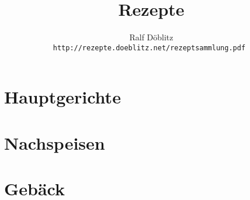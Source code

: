 \documentclass[12pt,a4paper]{report}
\begin{document}
\title{\bfseries\Huge Rezepte}
\author{
  Ralf Döblitz\\[1cm]
  \tt{http://rezepte.doeblitz.net/rezeptsammlung.pdf}
}
\maketitle
\tableofcontents

\chapter{Hauptgerichte}


\chapter{Nachspeisen}


\chapter{Gebäck}






\appendix

\printindex[recipe]

\printindex[ingredient]
\end{document}
